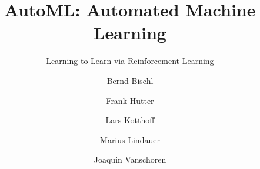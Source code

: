 




\title[AutoML: Learning to Control]{AutoML: Automated Machine Learning}
\subtitle{Learning to Learn via Reinforcement Learning}
\author[Marius Lindauer]{Bernd Bischl \and Frank Hutter \and Lars Kotthoff\newline \and \underline{Marius Lindauer} \and Joaquin Vanschoren}
\institute{}
\date{}





	
	\maketitle
	

